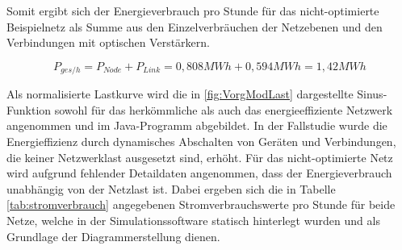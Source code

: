 Somit ergibt sich der Energieverbrauch pro Stunde für das nicht-optimierte Beispielnetz als Summe aus den Einzelverbräuchen der Netzebenen und den Verbindungen mit optischen Verstärkern.

 \begin{equation}
P_{ges/h} = P_{Node} + P_{Link} = 0,808 MWh + 0,594 MWh = 1,42 MWh
 \end{equation}


Als normalisierte Lastkurve wird die in \ref{fig:VorgModLast} dargestellte Sinus-Funktion sowohl für das her\-kömm\-liche als auch das energieeffiziente Netzwerk angenommen und im Java-Programm abgebildet. In der Fallstudie wurde die Energieffizienz durch dynamisches Abschalten von Geräten und Verbindungen, die keiner Netzwerklast ausgesetzt sind, erhöht.\cite[3]{Chiaraviglio2009} Für das nicht-optimierte Netz wird aufgrund fehlender Detaildaten angenommen, dass der Energieverbrauch unabhängig von der Netzlast ist. Dabei ergeben sich die in Tabelle \ref{tab:stromverbrauch} angegebenen Stromverbrauchswerte pro Stunde für beide Netze, welche in der Simulationssoftware statisch hinterlegt wurden und als Grundlage der Diagrammerstellung dienen.

